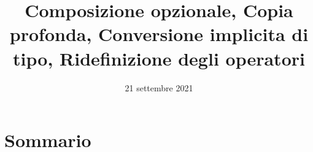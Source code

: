 \documentclass[xcolor={dvipsnames, svgnames, x11names, table}, 10pt]{beamer}
\title{Composizione opzionale, Copia profonda, Conversione implicita di tipo, Ridefinizione degli operatori}
\date{21 settembre 2021}
\begin{document}
\frame{\titlepage}

\section*{Sommario}
\begin{frame}
    \tableofcontents[pausesections]
\end{frame}
\end{document}
